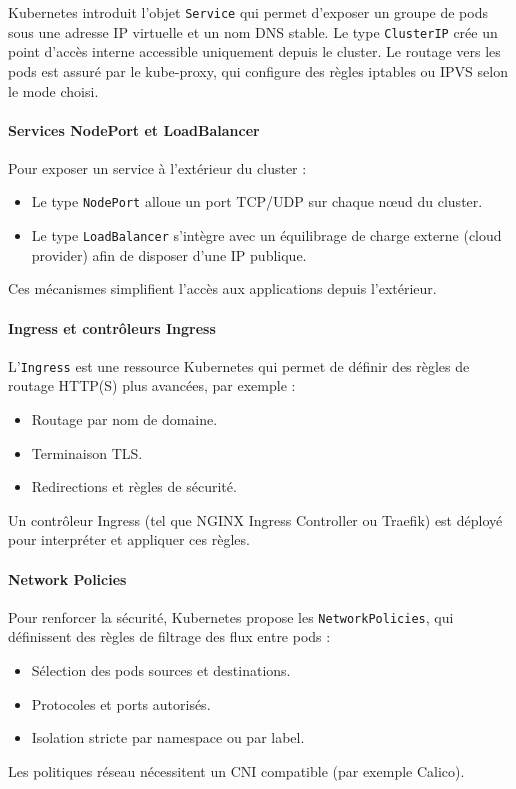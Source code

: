 Kubernetes introduit l’objet \texttt{Service} qui permet d’exposer un groupe de pods sous une adresse IP virtuelle et un nom DNS stable.
Le type \texttt{ClusterIP} crée un point d’accès interne accessible uniquement depuis le cluster.
Le routage vers les pods est assuré par le kube-proxy, qui configure des règles iptables ou IPVS selon le mode choisi.

\paragraph{Services NodePort et LoadBalancer}

Pour exposer un service à l’extérieur du cluster :
\begin{itemize}
	\item Le type \texttt{NodePort} alloue un port TCP/UDP sur chaque nœud du cluster.
	\item Le type \texttt{LoadBalancer} s’intègre avec un équilibrage de charge externe (cloud provider) afin de disposer d’une IP publique.
\end{itemize}
Ces mécanismes simplifient l’accès aux applications depuis l’extérieur.

\paragraph{Ingress et contrôleurs Ingress}

L’\texttt{Ingress} est une ressource Kubernetes qui permet de définir des règles de routage HTTP(S) plus avancées, par exemple :
\begin{itemize}
	\item Routage par nom de domaine.
	\item Terminaison TLS.
	\item Redirections et règles de sécurité.
\end{itemize}
Un contrôleur Ingress (tel que NGINX Ingress Controller ou Traefik) est déployé pour interpréter et appliquer ces règles.

\paragraph{Network Policies}

Pour renforcer la sécurité, Kubernetes propose les \texttt{NetworkPolicies}, qui définissent des règles de filtrage des flux entre pods :
\begin{itemize}
	\item Sélection des pods sources et destinations.
	\item Protocoles et ports autorisés.
	\item Isolation stricte par namespace ou par label.
\end{itemize}
Les politiques réseau nécessitent un CNI compatible (par exemple Calico).

